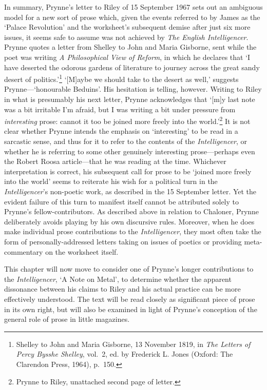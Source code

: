 \documentclass[]{article}
\begin{document}
In summary, Prynne's letter to Riley of 15 September 1967 sets out an
ambiguous model for a new sort of prose which, given the events referred
to by James as the `Palace Revolution' and the worksheet's subsequent
demise after just six more issues, it seems safe to assume was not
achieved by \emph{The English Intelligencer}. Prynne quotes a letter
from Shelley to John and Maria Gisborne, sent while the poet was writing
\emph{A Philosophical View of Reform}, in which he declares that `I have
deserted the odorous gardens of literature to journey across the great
sandy desert of politics.'\footnote{Shelley to John and Maria Gisborne,
  13 November 1819, in \emph{The Letters of Percy Bysshe Shelley},
  vol.~2, ed. by Frederick L. Jones (Oxford: The Clarendon Press, 1964),
  p.~150.} `{[}M{]}aybe we should take to the desert as well,' suggests
Prynne---`honourable Beduins'. His hesitation is telling, however.
Writing to Riley in what is presumably his next letter, Prynne
acknowledges that `{[}m{]}y last note was a bit irritable I'm afraid,
but I was writing a bit under pressure from \emph{interesting} prose:
cannot it too be joined more freely into the world.'\footnote{Prynne to
  Riley, unattached second page of letter.} It is not clear whether
Prynne intends the emphasis on `interesting' to be read in a sarcastic
sense, and thus for it to refer to the contents of the
\emph{Intelligencer}, or whether he is referring to some other genuinely
interesting prose---perhaps even the Robert Roosa article---that he was
reading at the time. Whichever interpretation is correct, his subsequent
call for prose to be `joined more freely into the world' seems to
reiterate his wish for a political turn in the \emph{Intelligencer}'s
non-poetic work, as described in the 15 September letter. Yet the
evident failure of this turn to manifest itself cannot be attributed
solely to Prynne's fellow-contributors. As described above in relation
to Chaloner, Prynne deliberately avoids playing by his own discursive
rules. Moreover, when he does make individual prose contributions to the
\emph{Intelligencer}, they most often take the form of
personally-addressed letters taking on issues of poetics or providing
meta-commentary on the worksheet itself.

This chapter will now move to consider one of Prynne's longer
contributions to the \emph{Intelligencer}, `A Note on Metal', to
determine whether the apparent dissonance between his claims to Riley
and his actual practice can be more effectively understood. The text
will be read closely as significant piece of prose in its own right, but
will also be examined in light of Prynne's conception of the general
role of prose in little magazines.
\end{document}
